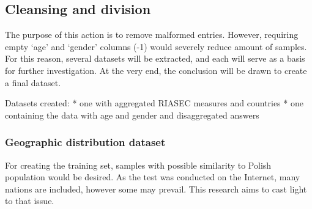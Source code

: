 \documentclass[11pt]{article}
\begin{document}
\subsection{Cleansing and division}\label{cleansing-and-division}

The purpose of this action is to remove malformed entries. However,
requiring empty `age' and `gender' columns (-1) would severely reduce
amount of samples. For this reason, several datasets will be extracted,
and each will serve as a basis for further investigation. At the very
end, the conclusion will be drawn to create a final dataset.

Datasets created: * one with aggregated RIASEC measures and countries *
one containing the data with age and gender and disaggregated answers

\subsubsection{Geographic distribution
dataset}\label{geographic-distribution-dataset}

For creating the training set, samples with possible similarity to
Polish population would be desired. As the test was conducted on the
Internet, many nations are included, however some may prevail. This
research aims to cast light to that issue.
\end{document}
